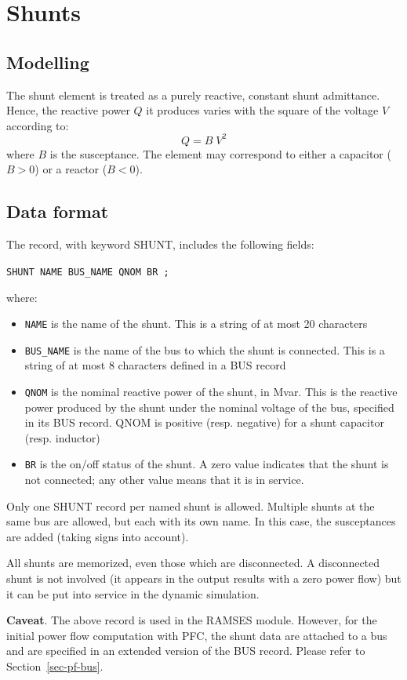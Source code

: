 \vspace*{-2ex}
\section{Shunts}\label{sec-netw-shunts}

\subsection{Modelling}

The shunt element is treated as a purely reactive, constant shunt admittance. Hence, the reactive power $Q$ it produces varies with the square of the voltage $V$ according to:
\[ Q = B \; V^2 \]
where $B$ is the susceptance. The element may correspond to either a capacitor ($B>0$) or a reactor ($B<0$).

\subsection{Data format}

The record, with keyword SHUNT, includes the following fields:

\hspace*{5ex}\mbox{\tt SHUNT NAME BUS\_NAME QNOM BR ;}

where:
\begin{itemize}
\item{\tt NAME} is the name of the shunt. This is a string of at most 20 characters
\item{\tt BUS\_NAME} is the name of the bus to which the shunt is connected. This is a string of at most 8 characters defined in a BUS record
\item{\tt QNOM} is the nominal reactive power of the shunt, in Mvar. This is the reactive power produced by the shunt under the nominal voltage of the bus, specified in its BUS record. QNOM is positive (resp. negative) for a shunt capacitor (resp. inductor)
\item{\tt BR} is the on/off status of the shunt. A zero value indicates that the shunt
is not connected; any other value means that it is in service.
\end{itemize}

Only one SHUNT record per named shunt is allowed. Multiple shunts at the same bus are allowed, but each with its own name. In this case, the susceptances are added (taking signs into account).

All shunts are memorized, even those which are disconnected. A disconnected shunt is not involved (it appears in the output results with a zero power flow) but it can be put into service in the dynamic simulation.

{\bf \large Caveat}. The above record is used in the RAMSES module. However, for the initial power flow computation with PFC, the shunt data are attached to a bus and are specified in an extended version of the BUS record. Please refer to Section~\ref{sec-pf-bus}.


